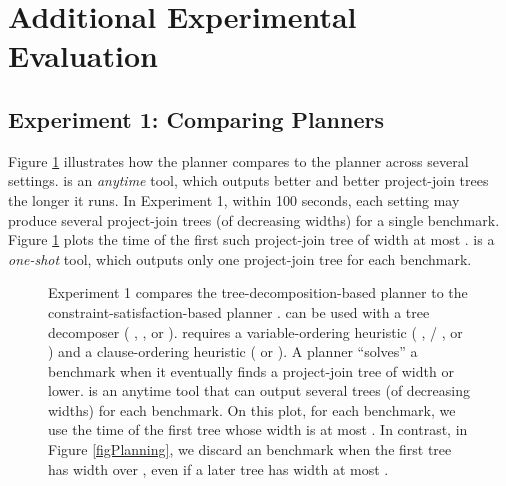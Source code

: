 





\section{Additional Experimental Evaluation}
\label{appendix:exp}


\subsection{Experiment 1: Comparing Planners}

Figure \ref{figPlanningA} illustrates how the planner \Lg{} compares to the planner \htb{} across several settings.
\Lg{} is an \emph{anytime} tool, which outputs better and better project-join trees the longer it runs.
In Experiment 1, within 100 seconds, each \Lg{} setting may produce several project-join trees (of decreasing widths) for a single benchmark.
Figure \ref{figPlanningA} plots the time of the first such project-join tree of width at most \maxWidth.
\htb{} is a \emph{one-shot} tool, which outputs only one project-join tree for each benchmark.
\begin{figure}[H]
    \centering
    
    \caption{
        Experiment 1 compares the tree-decomposition-based planner \Lg{} to the constraint-satisfaction-based planner \htb{}. 
        \Lg{} can be used with a tree decomposer (\flowcutter{} \cite{strasser2017computing}, \htd{} \cite{AMW17}, or \tamaki{} \cite{Tamaki17}).
        \htb{} requires a variable-ordering heuristic (\mcs{} \cite{tarjan1984simple}, \lexp/\lexm{} \cite{koster2001treewidth}, or \minfill{} \cite{dechter03}) and a clause-ordering heuristic (\be{} \cite{dechter99} or \bm{} \cite{bouquet1999gestion}).
        A planner ``solves'' a benchmark when it eventually finds a project-join tree of width \maxWidth{} or lower.
        \Lg{} is an anytime tool that can output several trees (of decreasing widths) for each benchmark.
        On this plot, for each \Lg{} benchmark, we use the time of the first tree whose width is at most \maxWidth.
        In contrast, in Figure \ref{figPlanning}, we discard an \Lg{} benchmark when the first tree has width over \maxWidth, even if a later tree has width at most \maxWidth.
    }
    \label{figPlanningA}
\end{figure}

